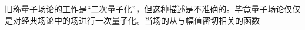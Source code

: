 \begin{issues}
\issueDraft
\end{issues}
旧称量子场论的工作是“二次量子化”，但这种描述是不准确的。毕竟量子场论仅仅是对经典场论中的场进行一次量子化。当场的从与幅值密切相关的函数
